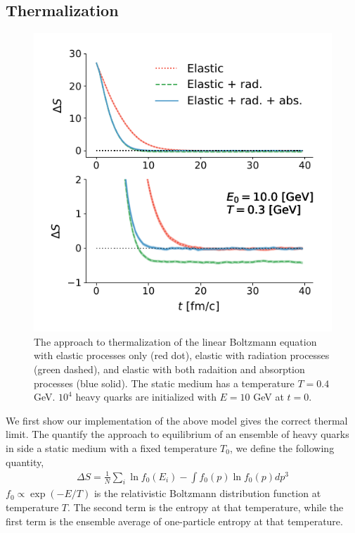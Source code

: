 \documentclass[aps, prc, reprint, amsmath, groupedaddress, nofootinbib]{revtex4-1}
\begin{document}
\subsection{Thermalization}
\begin{figure}
\includegraphics[width=\columnwidth]{thermalization.pdf}
\caption{The approach to thermalization of the linear Boltzmann equation with elastic processes only (red dot), elastic with radiation processes (green dashed), and elastic with both radaition and absorption processes (blue solid). The static medium has a temperature $T = 0.4$ GeV. $10^4$ heavy quarks are initialized with $E = 10$ GeV at $t = 0$.}\label{plots:thermalization}
\end{figure}
We first show our implementation of the above model gives the correct thermal limit. 
The quantify the approach to equilibrium of an ensemble of heavy quarks in side a static medium with a fixed temperature $T_0$, we define the following quantity,
\begin{eqnarray}
\Delta S = \frac{1}{N}\sum_i \ln f_0(E_i) - \int f_0(p)\ln f_0(p) dp^3
\end{eqnarray}
$f_0 \propto \exp(-E/T)$ is the relativistic Boltzmann distribution function at temperature $T$. 
The second term is the entropy at that temperature, while the first term is the ensemble average of one-particle entropy at that temperature.
\end{document}
